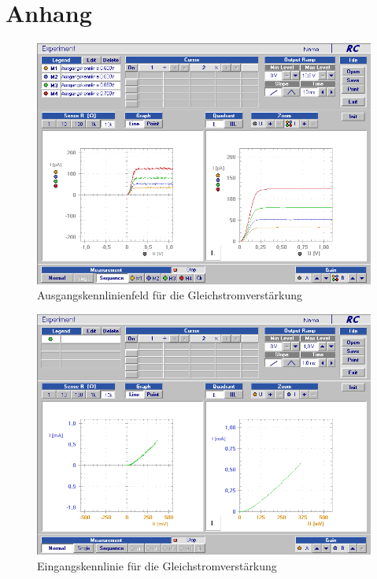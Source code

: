 \documentclass[12pt,a4paper]{article}
\begin{document}
\section{Anhang}

\begin{figure}[H]
	\centering
	\includegraphics[scale=0.5]{./data/Braun_Kurz_PS8/Ausgangskennlinienfeld.png}
	\caption{Ausgangskennlinienfeld für die Gleichstromverstärkung}
	\label{fig:ausgangskennlinienfeld}
\end{figure}

\begin{figure}[H]
	\centering
	\includegraphics[scale=0.5]{./data/Braun_Kurz_PS8/Gleichstromverstaerkung.png}
	\caption{Eingangskennlinie für die Gleichstromverstärkung}
	\label{fig:eingangsskennlinien}
\end{figure}
\end{document}
